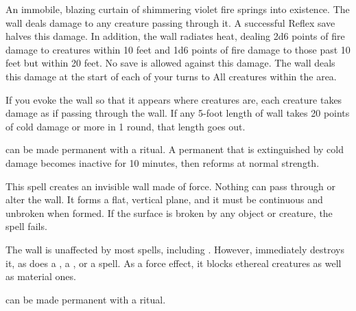 \spellrng{\rngmed}
\spelldur{\durshort}
\begin{spelleffect}
  An immobile, blazing curtain of shimmering violet fire springs into existence. The wall deals damage to any creature passing through it. A successful Reflex save halves this damage. In addition, the wall radiates heat, dealing 2d6 points of fire damage to creatures within 10 feet and 1d6 points of fire damage to those past 10 feet but within 20 feet. No save is allowed against this damage. The wall deals this damage at the start of each of your turns to All creatures within the area.
  \par If you evoke the wall so that it appears where creatures are, each creature takes damage as if passing through the wall. If any 5-foot length of wall takes 20 points of cold damage or more in 1 round, that length goes out.
\end{spelleffect}
\begin{spellnotes}
   can be made permanent with a  ritual. A permanent  that is extinguished by cold damage becomes inactive for 10 minutes, then reforms at normal strength.
\end{spellnotes}

\spellrng{\rngmed}
\begin{spelleffect}
  This spell creates an invisible wall made of force. Nothing can pass through or alter the wall. It forms a flat, vertical plane, and it must be continuous and unbroken when formed. If the surface is broken by any object or creature, the spell fails.
\end{spelleffect}
\begin{spellnotes}
  The wall is unaffected by most spells, including . However,  immediately destroys it, as does a , a , or a  spell. As a force effect, it blocks ethereal creatures as well as material ones.
  \par {} can be made permanent with a  ritual.
\end{spellnotes}

